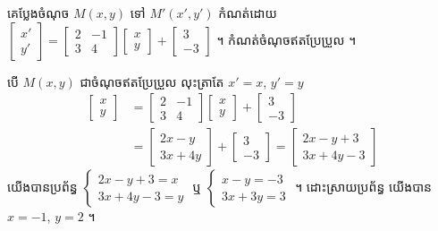\begin{example}[លំហាត់គំរូ ១]
គេប្លែងចំណុច $M(x, y)$ ទៅ $M'(x', y')$ កំណត់ដោយ $\begin{bmatrix} x'\\ y' \end{bmatrix} = \begin{bmatrix} 2 & -1\\ 3 & 4 \end{bmatrix}\begin{bmatrix} x\\ y \end{bmatrix} + \begin{bmatrix} 3\\ -3 \end{bmatrix}$ ។ កំណត់ចំណុចឥតប្រែប្រួល ។
\end{example}
\ans
បើ $M(x, y)$ ជាចំណុចឥតប្រែប្រួល លុះត្រាតែ $x' = x$, $y' = y$
\[
\begin{aligned}
\begin{bmatrix} x\\ y \end{bmatrix} &= \begin{bmatrix} 2 & -1\\ 3 & 4 \end{bmatrix}\begin{bmatrix} x\\ y \end{bmatrix} + \begin{bmatrix} 3\\ -3 \end{bmatrix}\\
&= \begin{bmatrix} 2x - y\\ 3x + 4y \end{bmatrix} + \begin{bmatrix} 3\\ -3 \end{bmatrix} = \begin{bmatrix} 2x - y + 3\\ 3x + 4y - 3 \end{bmatrix}
\end{aligned}
\]
យើងបានប្រព័ន្ធ $\begin{cases} 2x - y + 3 = x\\ 3x + 4y - 3 = y \end{cases}$ ឬ $\begin{cases} x - y = -3\\ 3x + 3y = 3 \end{cases}$ ។ ដោះស្រាយប្រព័ន្ធ យើងបាន $x = -1$, $y = 2$ ។

